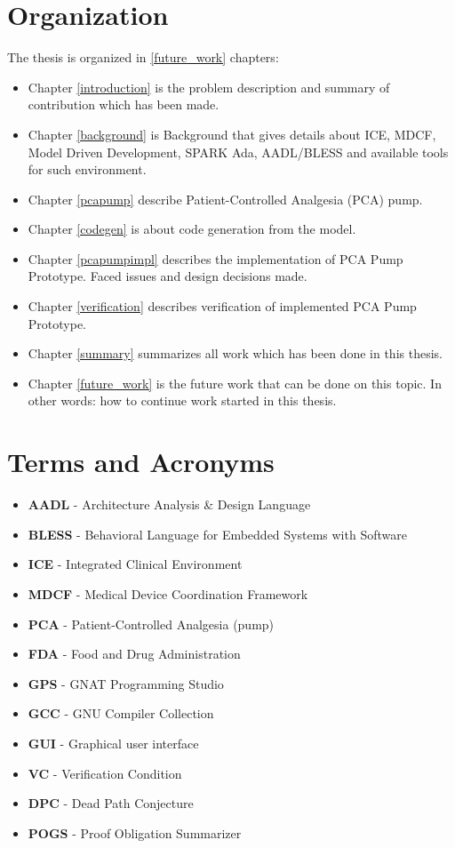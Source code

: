 \section{Organization}
\label{introduction:organization}
The thesis is organized in \ref{future_work} chapters:
\begin{itemize}
	\item Chapter \ref{introduction} is the problem description and summary of contribution which has been made. 
	\item Chapter \ref{background} is Background that gives details about ICE, MDCF, Model Driven Development, SPARK Ada, AADL/BLESS and available tools for such environment. 
	\item Chapter \ref{pcapump} describe Patient-Controlled Analgesia (PCA) pump.
	\item Chapter \ref{codegen} is about code generation from the model. 
	\item Chapter \ref{pcapumpimpl} describes the implementation of PCA Pump Prototype. Faced issues and design decisions made.
	\item Chapter \ref{verification} describes verification of implemented PCA Pump Prototype. 
	\item Chapter \ref{summary} summarizes all work which has been done in this thesis. 
	\item Chapter \ref{future_work} is the future work that can be done on this topic. In other words: how to continue work started in this thesis.
\end{itemize}


\section{Terms and Acronyms}
\label{introduction:terms}

\begin{itemize}
	\item \textbf{AADL} - Architecture Analysis \& Design Language
	\item \textbf{BLESS} - Behavioral Language for Embedded Systems with Software
	\item \textbf{ICE} - Integrated Clinical Environment
	\item \textbf{MDCF} - Medical Device Coordination Framework
	\item \textbf{PCA} - Patient-Controlled Analgesia (pump)
	\item \textbf{FDA} - Food and Drug Administration
	\item \textbf{GPS} - GNAT Programming Studio
	\item \textbf{GCC} - GNU Compiler Collection
	\item \textbf{GUI} - Graphical user interface
	\item \textbf{VC} - Verification Condition
	\item \textbf{DPC} - Dead Path Conjecture
	\item \textbf{POGS} - Proof Obligation Summarizer
\end{itemize}